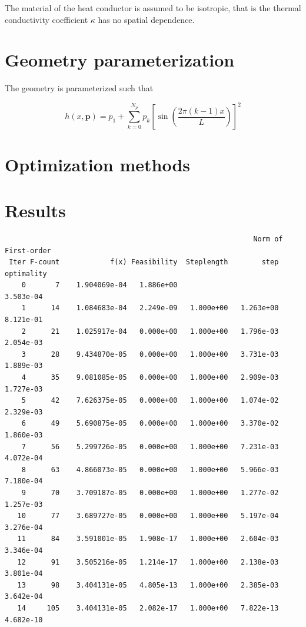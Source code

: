 \documentclass[11pt]{article}
\begin{document}
The material of the heat conductor is assumed to be isotropic, that is
the thermal conductivity coefficient $\kappa$ has no spatial dependence.

\section{Geometry parameterization}

The geometry is parameterized such that

\[
h(x,\boldsymbol{p}) = p_1 + \sum_{k=0}^{N_p} p_k 
\left[ \sin \left( \frac{2 \pi (k-1) x}{L} \right) \right]^2
\]


\section{Optimization methods}

\section{Results}

\begin{center}
\scriptsize
\begin{verbatim}
                                                           Norm of First-order
 Iter F-count            f(x) Feasibility  Steplength        step  optimality
    0       7    1.904069e-04   1.886e+00                           3.503e-04
    1      14    1.084683e-04   2.249e-09   1.000e+00   1.263e+00   8.121e-01
    2      21    1.025917e-04   0.000e+00   1.000e+00   1.796e-03   2.054e-03
    3      28    9.434870e-05   0.000e+00   1.000e+00   3.731e-03   1.889e-03
    4      35    9.081085e-05   0.000e+00   1.000e+00   2.909e-03   1.727e-03
    5      42    7.626375e-05   0.000e+00   1.000e+00   1.074e-02   2.329e-03
    6      49    5.690875e-05   0.000e+00   1.000e+00   3.370e-02   1.860e-03
    7      56    5.299726e-05   0.000e+00   1.000e+00   7.231e-03   4.072e-04
    8      63    4.866073e-05   0.000e+00   1.000e+00   5.966e-03   7.180e-04
    9      70    3.709187e-05   0.000e+00   1.000e+00   1.277e-02   1.257e-03
   10      77    3.689727e-05   0.000e+00   1.000e+00   5.197e-04   3.276e-04
   11      84    3.591001e-05   1.908e-17   1.000e+00   2.604e-03   3.346e-04
   12      91    3.505216e-05   1.214e-17   1.000e+00   2.138e-03   3.801e-04
   13      98    3.404131e-05   4.805e-13   1.000e+00   2.385e-03   3.642e-04
   14     105    3.404131e-05   2.082e-17   1.000e+00   7.822e-13   4.682e-10
\end{verbatim}
\end{center}
\end{document}
